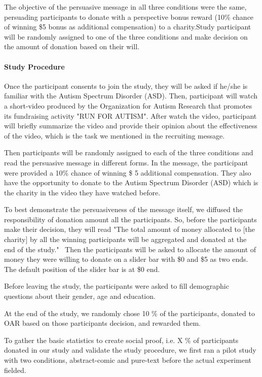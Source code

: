 The objective of the persuasive message in all three conditions were the same, persuading participants to donate with a perspective bonus reward (10\% chance of winning \$5 bonus as additional compensation) to a charity.Study participant will be randomly assigned to one of the three conditions and make decision on the amount of donation based on their will.

\paragraph{Study Procedure} Once the participant consents to join the study, they will be asked if he/she is familiar with the Autism Spectrum Disorder (ASD). Then, participant will watch a short-video produced by the Organization for Autism Research that promotes its fundraising activity "RUN FOR AUTISM". After watch the video, participant will briefly summarize the video and provide their opinion about the effectiveness of the video, which is the task we mentioned in the recruiting message.

Then participants will be randomly assigned to each of the three conditions and read the persuasive message in different forms. In the message, the participant were provided a 10\% chance of winning \$ 5 additional compensation. They also have the opportunity to donate to the Autism Spectrum Disorder (ASD) which is the charity in the video they have watched before.

To best demonstrate the persuasiveness of the message itself, we diffused the responsibility of donation amount all the participants. So, before the participants make their decision, they will read "The total amount of money allocated to [the charity] by all the winning participants will be aggregated and donated at the end of the study."~\cite{} Then the participants will be asked to allocate the amount of money they were willing to donate on a slider bar with \$0 and \$5 as two ends. The default position of the slider bar is at \$0 end.

Before leaving the study, the participants were asked to fill demographic questions about their gender, age and education.

At the end of the study, we randomly chose 10 \% of the participants, donated to OAR based on those participants decision, and rewarded them.

To gather the basic statistics to create social proof, i.e.  X \% of participants donated in our study and validate the study procedure, we first ran a pilot study with two conditions, abstract-comic and pure-text before the actual experiment fielded.


